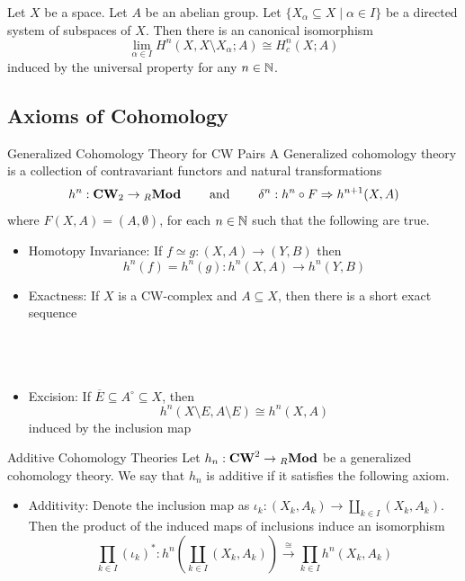 \documentclass[a4paper]{article}
\begin{document}
\begin{prp}{}{} Let $X$ be a space. Let $A$ be an abelian group. Let $\{X_\alpha\subseteq X\;|\;\alpha\in I\}$ be a directed system of subspaces of $X$. Then there is an canonical isomorphism $$\lim_{\alpha\in I}H^n(X,X\setminus X_\alpha;A)\cong H_c^n(X;A)$$ induced by the universal property for any $n\in\mathbb{N}$. 
\end{prp}

\subsection{Axioms of Cohomology}
\begin{defn}{Generalized Cohomology Theory for CW Pairs}{} A Generalized cohomology theory is a collection of contravariant functors and natural transformations $$h^n:\bold{CW}_2\to{_R\bold{Mod}}\;\;\;\;\;\;\;\text{ and }\;\;\;\;\;\;\;\delta^n:h^n\circ F\Rightarrow h^{n+1}(X,A)$$ where $F(X,A)=(A,\emptyset)$, for each $n\in\mathbb{N}$ such that the following are true. 
\begin{itemize}
\item Homotopy Invariance: If $f\simeq g:(X,A)\to(Y,B)$ then $$h^n(f)=h^n(g):h^n(X,A)\to h^n(Y,B)$$
\item Exactness: If $X$ is a CW-complex and $A\subseteq X$, then there is a short exact sequence \\~\\
\\~\\
\item Excision: If $\overline{E}\subseteq A^\circ\subseteq X$, then $$h^n(X\setminus E,A\setminus E)\cong h^n(X,A)$$ induced by the inclusion map
\end{itemize}
\end{defn}

\begin{defn}{Additive Cohomology Theories}{} Let $h_n:\bold{CW}^2\to{_R\bold{Mod}}$ be a generalized cohomology theory. We say that $h_n$ is additive if it satisfies the following axiom. 
\begin{itemize}
\item Additivity: Denote the inclusion map as $\iota_k:(X_k,A_k)\to\coprod_{k\in I}(X_k,A_k)$. Then the product of the induced maps of inclusions induce an isomorphism $$\prod_{k\in I}(\iota_k)^\ast:h^n\left(\coprod_{k\in I}(X_k,A_k)\right)\overset{\cong}{\longrightarrow}\prod_{k\in I}h^n(X_k,A_k)$$
\end{itemize}
\end{defn}
\end{document}
